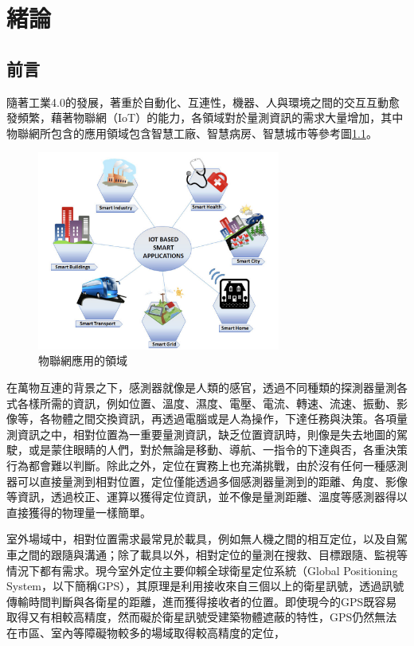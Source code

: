 \chapter{緒論}


\section{前言} %

隨著工業4.0的發展，著重於自動化、互連性，機器、人與環境之間的交互互動愈發頻繁，藉著物聯網（IoT）的能力，各領域對於量測資訊的需求大量增加，其中物聯網所包含的應用領域包含智慧工廠、智慧病房、智慧城市等參考圖\ref{pic:iot}\cite{iot}。

\begin{figure}[ht]
    \centering
    \includegraphics[width=8cm]{ch1pic/iot.png}
    \caption{物聯網應用的領域\cite{iot}}
    \label{pic:iot}
\end{figure}

在萬物互連的背景之下，感測器就像是人類的感官，透過不同種類的探測器量測各式各樣所需的資訊，例如位置、溫度、濕度、電壓、電流、轉速、流速、振動、影像等，各物體之間交換資訊，再透過電腦或是人為操作，下達任務與決策。各項量測資訊之中，相對位置為一重要量測資訊，缺乏位置資訊時，則像是失去地圖的駕駛，或是蒙住眼睛的人們，對於無論是移動、導航、一指令的下達與否，各重決策行為都會難以判斷。除此之外，定位在實務上也充滿挑戰，由於沒有任何一種感測器可以直接量測到相對位置，定位僅能透過多個感測器量測到的距離、角度、影像等資訊，透過校正、運算以獲得定位資訊，並不像是量測距離、溫度等感測器得以直接獲得的物理量一樣簡單。



室外場域中，相對位置需求最常見於載具，例如無人機之間的相互定位，以及自駕車之間的跟隨與溝通；除了載具以外，相對定位的量測在搜救、目標跟隨、監視等情況下都有需求\cite{outdoor_scenario}。現今室外定位主要仰賴全球衛星定位系統（Global Positioning System，以下簡稱GPS）\cite{GPS_important}，其原理是利用接收來自三個以上的衛星訊號，透過訊號傳輸時間判斷與各衛星的距離，進而獲得接收者的位置。即使現今的GPS既容易取得又有相較高精度\cite{survey_light2020}，然而礙於衛星訊號受建築物體遮蔽的特性，GPS仍然無法在市區、室內等障礙物較多的場域取得較高精度的定位\cite{survey_light2018}，

